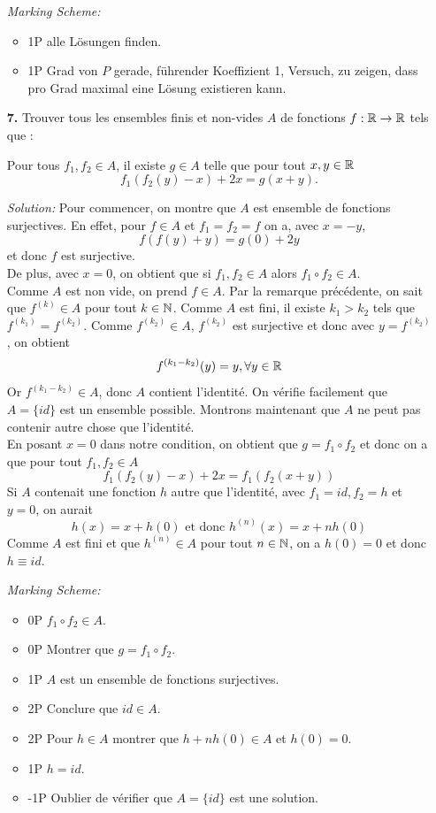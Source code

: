 \documentclass[language=german,style=solution]{smo}
\begin{document}
\begin{enumerate}
\textit{Marking Scheme:}
\begin{itemize}
	\item 1P alle Lösungen finden.
	\item 1P Grad von $P$ gerade, führender Koeffizient 1, Versuch, zu zeigen, dass pro Grad maximal eine Lösung existieren kann.
\end{itemize}

\newpage

\item[\textbf{7.}] %
Trouver tous les ensembles finis et non-vides $A$ de fonctions $f : \mathbb{R} \rightarrow \mathbb{R}$ tels que :

Pour tous $f_1,f_2 \in A$, il existe $g \in A$ telle que pour tout $x,y \in \mathbb{R}$
\[
f_1(f_2(y)-x)+2x=g(x+y).
\]

\textit{Solution:}
Pour commencer, on montre que $A$ est ensemble de fonctions surjectives. En effet, pour $f\in A$ et $f_1=f_2=f$ on a, avec $x=-y$, 
\[
	f(f(y)+y)=g(0)+2y
\]
et donc $f$ est surjective.\\
De plus, avec $x=0$, on obtient que si $f_1,f_2 \in A$ alors $f_1\circ f_2 \in A$.\\
Comme $A$ est non vide, on prend $f\in A$. Par la remarque précédente, on sait que $f^{(k)} \in A$ pour tout $k\in \mathbb{N}$. Comme $A$ est fini, il existe $k_1>k_2$ tels que $f^{(k_1)}=f^{(k_2)}$. Comme $f^{(k_2)}\in A$, $f^{(k_2)}$ est surjective et donc avec $y=f^{(k_2)}$, on obtient
\[
	f^{(k_1-k_2)}(y)=y, \forall y\in \mathbb{R}
\]
Or $f^{(k_1-k_2)}\in A$, donc $A$ contient l'identité. On vérifie facilement que $A=\{id\}$ est un ensemble possible. Montrons maintenant que $A$ ne peut pas contenir autre chose que l'identité.\\
En posant $x=0$ dans notre condition, on obtient que $g=f_1\circ f_2$ et donc on a que pour tout $f_1,f_2 \in A$
\[
	f_1(f_2(y)-x)+2x=f_1(f_2(x+y))
\]
Si $A$ contenait une fonction $h$ autre que l'identité, avec $f_1=id, f_2=h$ et $y=0$, on aurait
\[
	h(x)=x+h(0) \text{  et donc  } h^{(n)}(x)=x+nh(0)
\]
Comme $A$ est fini et que $h^{(n)}\in A$ pour tout $n\in \mathbb{N}$, on a $h(0)=0$ et donc $h\equiv id$.

\textit{Marking Scheme:}
\begin{itemize}
	\item 0P $f_1\circ f_2 \in A$.
	\item 0P Montrer que $g = f_1\circ f_2$.
	\item 1P $A$ est un ensemble de fonctions surjectives.
	\item 2P Conclure que $id \in A$.
\end{itemize}
\vspace{5mm}	
\begin{itemize}	
	\item 2P Pour $h\in A$ montrer que $h+nh(0)\in A$ et $h(0)=0$.
	\item 1P $h=id$.
\end{itemize}
\vspace{5mm}
\begin{itemize}	
	\item -1P Oublier de vérifier que $A=\{id\}$ est une solution.
\end{itemize}




\end{enumerate}
\end{document}
